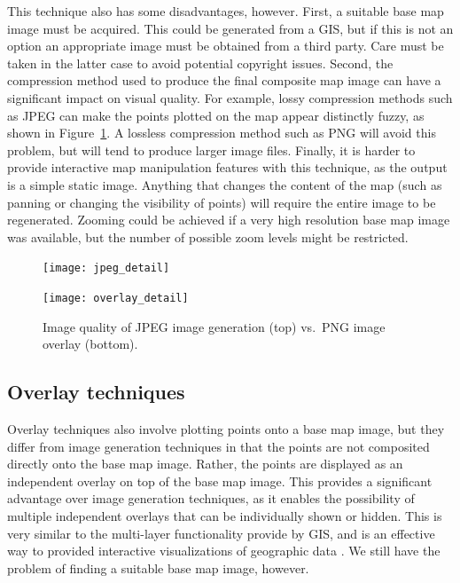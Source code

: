 \documentclass[acmtocl,acmnow]{acmtrans2m}
\begin{document}
This technique also has some disadvantages, however. First, a suitable
base map image must be acquired. This could be generated from a GIS, but
if this is not an option an appropriate image must be obtained from a
third party. Care must be taken in the latter case to avoid potential
copyright issues. Second, the compression method used to produce the
final composite map image can have a significant impact on visual
quality. For example, lossy compression methods such as JPEG can make
the points plotted on the map appear distinctly fuzzy, as shown in
Figure~\ref{fig-image-quality}. A lossless compression method such as
PNG will avoid this problem, but will tend to produce larger image
files. Finally, it is harder to provide interactive map manipulation
features with this technique, as the output is a simple static image.
Anything that changes the content of the map (such as panning or
changing the visibility of points) will require the entire image to be
regenerated. Zooming could be achieved if a very high resolution base
map image was available, but the number of possible zoom levels might be
restricted.


\begin{figure}
	\begin{center}
		\texttt{[image: jpeg\_detail]}\medskip
		
		\texttt{[image: overlay\_detail]}
	\end{center}
	\caption{Image quality of JPEG image generation (top) vs.\ PNG image
	overlay (bottom).}
	\label{fig-image-quality}
\end{figure}


\subsection{Overlay techniques}
\label{sec-overlay}


Overlay techniques also involve plotting points onto a base map image,
but they differ from image generation techniques in that the points are
not composited directly onto the base map image. Rather, the points are
displayed as an independent overlay on top of the base map image. This
provides a significant advantage over image generation techniques, as it
enables the possibility of multiple independent overlays that can be
individually shown or hidden. This is very similar to the multi-layer
functionality provide by GIS, and is an effective way to provided
interactive visualizations of geographic data
\cite{Wood-J-1996-vis,MacE-AM-1998-GIS}. We still have the problem of
finding a suitable base map image, however.
\end{document}
